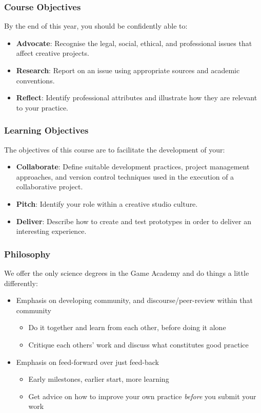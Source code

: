 \begin{frame}
	\frametitle{Course Objectives}
	
	By the end of this year, you should be confidently able to: \pause
	
	\begin{itemize}
		\item \textbf{Advocate}: Recognise the legal, social, ethical, and professional issues that affect creative projects. \pause
		\item \textbf{Research}: Report on an issue using appropriate sources and academic conventions.\pause
		\item \textbf{Reflect}: Identify professional attributes and illustrate how they are relevant to your practice.
	\end{itemize}
\end{frame}

\begin{frame}
	\frametitle{Learning Objectives}
	
	The objectives of this course are to facilitate the development of your:
	
	\begin{itemize}
		\item \textbf{Collaborate}: Define suitable development practices, project management approaches, and version control techniques used in the execution of a collaborative project. \pause
		\item \textbf{Pitch}: Identify your role within a creative studio culture. \pause
		\item \textbf{Deliver}: Describe how to create and test prototypes in order to deliver an interesting experience.
	\end{itemize}
\end{frame}

\begin{frame}
	\frametitle{Philosophy}
	
	We offer the only science degrees in the Game Academy and do things a little differently:
	
	\begin{itemize}
		\pause\item Emphasis on developing community, and discourse/peer-review within that community
		\begin{itemize}
			\item Do it together and learn from each other, before doing it alone
			\item Critique each others' work and discuss what constitutes good practice
		\end{itemize}
		\pause\item Emphasis on feed-forward over just feed-back
		\begin{itemize}
			\item Early milestones, earlier start, more learning
			\item Get advice on how to improve your own practice \textit{before} you submit your work
		\end{itemize}
	\end{itemize}
\end{frame}

